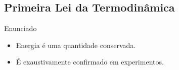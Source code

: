 \subsection{Primeira Lei da Termodinâmica}

    \begin{frame}{Enunciado}\vspace*{-2em}
        \begin{itemize}
            \item<1-> \alert{Energia} é uma quantidade \alert{conservada}. \\[\bigskipamount]
        \end{itemize}
        \begin{itemize}
            \item<2-> É exaustivamente \alert{confirmado} em experimentos.%
        \end{itemize}
    \end{frame}

